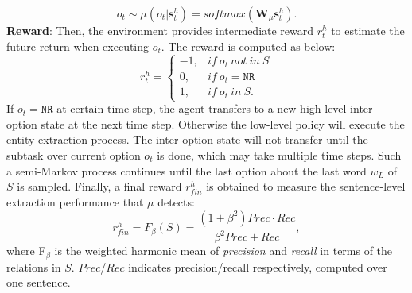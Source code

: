 \documentclass[letterpaper]{article}
\theoremstyle{definition}
\begin{document}
\begin{equation}\label{option}
    o_t \sim \mu(o_t|\mathbf{s}_t^h) = softmax(\mathbf{W}_\mu \mathbf{s}_t^h).
\end{equation}
\textbf{Reward}: Then, the environment provides intermediate reward $r_t^h$ to estimate the future return when executing $o_t$. The reward is computed as below:
\begin{equation}\label{reward_high}
    r_t^h = \left\{
    \begin{array}{ll}
        -1, &if ~ o_t ~ not ~ in ~ S\\
        0, &if ~ o_t = \texttt{NR} \\
        1, &if ~ o_t ~ in ~ S.
    \end{array}
    \right.
\end{equation}
If $o_t = \texttt{NR}$ at certain time step, the agent transfers to a new high-level inter-option state at the next time step. Otherwise the low-level policy will execute the entity extraction process. The inter-option state will not transfer until the subtask over current option $o_t$ is done, which may take multiple time steps. Such a semi-Markov process continues until the last option about the last word $w_L$ of $S$ is sampled. Finally, a final reward $r_{fin}^h$ is obtained to measure the sentence-level extraction performance that $\mu$ detects:
\begin{equation}\label{reward_h_final}
    r_{fin}^h = F_\beta(S) = \frac{(1 + \beta^2) Prec \cdot Rec}{\beta^2 Prec + Rec},
\end{equation}
where F$_\beta$ is the weighted harmonic mean of {\it precision} and {\it recall} in terms of the relations in $S$. $Prec$/$Rec$ indicates precision/recall respectively, computed over one sentence.
\end{document}
